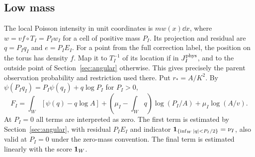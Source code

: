 \subsection{Low mass}
The local Poisson intensity in unit coordinates is
\(m w(x)\dd x\), where \(w=v f\circ T_I=P_I w_I\)
for a cell of positive mass \(P_I\). Its projection and residual
are \(q=P_I q_I\) and \(e=P_I E_I\).
For a point from the full correction label, the position
on the torus has density \(f\). Map it to \(T_I^{-1}\) of
its location if in \(J_I^{\rm phys}\), and to the outside
point of Section~\ref{sec:angular} otherwise. This gives
precisely the parent observation probability and restriction
used there. Put \(r_*=A/K^2\). By
\(\psi(P_I q_I)=P_I\psi(q_I)+q\log P_I\) for \(P_I>0\),
\begin{equation}\label{eq:low-decomp}
 F_I=\int_W [\psi(q)-q\log A]
       +\left(\mu_I-\int_W q\right)\log(P_I/A)
       +\mu_I\log(A/v).
\end{equation}
At \(P_I=0\) all terms are interpreted as zero.
The first term is estimated by Section~\ref{sec:angular},
with residual \(P_I E_I\) and indicator
\(\mathbf 1_{\{\inf_W |q|<P_I/2\}}=\nu_I\), also valid at \(P_I=0\)
under the zero-mass convention.
The final term is estimated linearly with the score \(\mathbf 1_W\).

